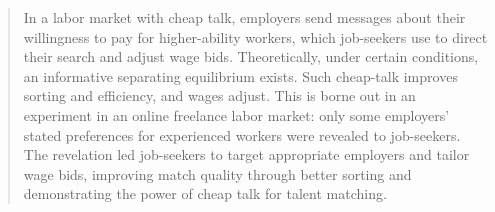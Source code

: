 \documentclass[12pt]{article}
\begin{document}
\begin{singlespacing}
\begin{abstract} 
\noindent

In a labor market with cheap talk, employers send messages about their willingness to pay for higher-ability workers, which job-seekers use to direct their search and adjust wage bids. Theoretically, under certain conditions, an informative separating equilibrium exists. Such cheap-talk improves sorting and efficiency, and wages adjust. This is borne out in an experiment in an online freelance labor market: only some employers' stated preferences for experienced workers were revealed to job-seekers. The revelation led job-seekers to target appropriate employers and tailor wage bids, improving match quality through better sorting and demonstrating the power of cheap talk for talent matching.


\end{abstract} 

\end{singlespacing}
\end{document}
